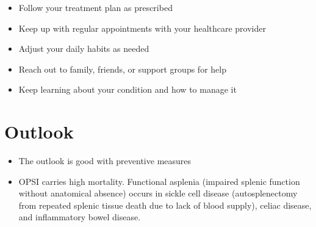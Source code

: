 \begin{itemize}[noitemsep]
  \item Follow your treatment plan as prescribed
  \item Keep up with regular appointments with your healthcare provider
  \item Adjust your daily habits as needed
  \item Reach out to family, friends, or support groups for help
  \item Keep learning about your condition and how to manage it
\end{itemize}

\section{Outlook}

\begin{itemize}[noitemsep]
  \item The outlook is good with preventive measures
  \item OPSI carries high mortality. Functional asplenia (impaired splenic function without anatomical absence) occurs in sickle cell disease (autosplenectomy from repeated splenic tissue death due to lack of blood supply), celiac disease, and inflammatory bowel disease.
\end{itemize}
